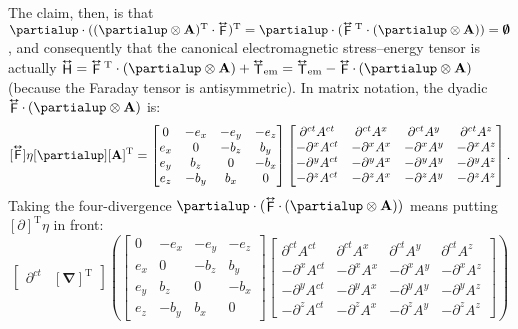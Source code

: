 \documentclass[12pt]{article}
\renewcommand{\vv}[1]{\mathbf{#1}}
\newcommand{\del}{\boldsymbol{\nabla}}
\newcommand{\tightoverset}[2]{%
  \mathop{#2}\limits^{\vbox to -.5ex{\kern-0.75ex\hbox{$#1$}\vss}}}
\newcommand{\inlinedy}[1]{\tightoverset{\text{\tiny$\bm\leftrightarrow$}}{#1}}
\newcommand{\capdy}[1]{ \overset{ \text{\tiny$\bm\leftrightarrow$} }{\vphantom{\text{\small{A}}}\smash{#1}} }
\begin{document}
The claim, then, is that $\partialup \cdot ( ( \partialup \otimes \vv A )^\mathrm{T} \cdot \inlinedy{\mathsf{F}} )^{\mathrm{T}} = \partialup \cdot ( \inlinedy{\mathsf{F}} {}^{\mathrm{T}} \cdot ( \partialup \otimes \vv A ) )  = \textrm{\mbox{\boldmath $\emptyset$}}$, and consequently that the canonical electromagnetic stress--energy tensor is actually $\inlinedy{\mathsf{H}} = \inlinedy{\mathsf{F}} {}^{\mathrm{T}} \cdot ( \partialup \otimes \vv A ) + {\inlinedy{\mathsf{T}}}_{\textrm{em}} = {\inlinedy{\mathsf{T}}}_{\textrm{em}} - \inlinedy{\mathsf{F}} \cdot \, ( \partialup \otimes \vv A ) $ (because the Faraday tensor is antisymmetric). In matrix notation, the dyadic $ \inlinedy{\mathsf{F}} \cdot \, ( \partialup \otimes \vv A )$ is:
\begin{equation*}
\mkern0mu [\capdy{\mathsf{F}}] \eta [\partialup] [\vv A]^{\mathrm{T}} =
\begin{bmatrix}
0 & -e_x & -e_y & -e_z \\
e_x & 0 & -b_z & b_y \\
e_y & b_z & 0 & -b_x \\
e_z & -b_y & b_x & 0
\end{bmatrix}
\begin{bmatrix}
\partial^{ct} A^{ct} & \partial^{ct} A^x & \partial^{ct} A^y & \partial^{ct} A^z \\
- \partial^x A^{ct} & - \partial^x A^x & - \partial^x A^y & - \partial^x A^z  \\
- \partial^y A^{ct} & - \partial^y A^x & - \partial^y A^y & - \partial^y A^z \\
- \partial^z A^{ct} & - \partial^z A^x & - \partial^z A^y & - \partial^z A^z
\end{bmatrix} .
\end{equation*}
Taking the four-divergence $\partialup \cdot (\inlinedy{\mathsf{F}} \cdot \, ( \partialup \otimes \vv A ))$ means putting $[\partialup]^\mathrm{T}\eta$ in front:
\begin{equation*}
\begin{bmatrix}
\partial^{ct} & [ \del ]^\mathrm{T}
\end{bmatrix}
\left(
\begin{bmatrix}
0 & -e_x & -e_y & -e_z \\
e_x & 0 & -b_z & b_y \\
e_y & b_z & 0 & -b_x \\
e_z & -b_y & b_x & 0
\end{bmatrix}
\begin{bmatrix}
\partial^{ct} A^{ct} & \partial^{ct} A^x & \partial^{ct} A^y & \partial^{ct} A^z \\
- \partial^x A^{ct} & - \partial^x A^x & - \partial^x A^y & - \partial^x A^z  \\
- \partial^y A^{ct} & - \partial^y A^x & - \partial^y A^y & - \partial^y A^z \\
- \partial^z A^{ct} & - \partial^z A^x & - \partial^z A^y & - \partial^z A^z
\end{bmatrix}
\right)
\end{equation*}
\end{document}
